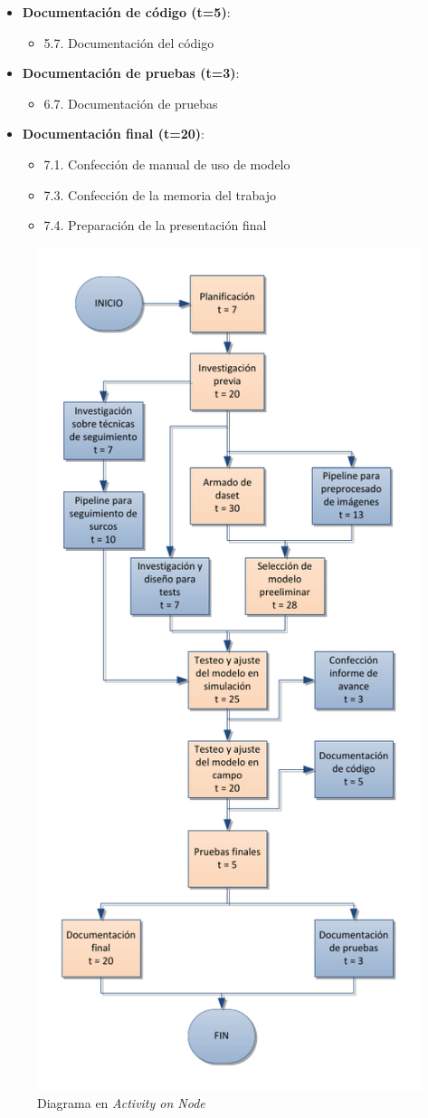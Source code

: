 \documentclass[
11pt, %
]{charter}
\begin{document}
\begin{itemize}
\item \textbf{Documentación de código (t=5)}:
\begin{itemize}
\item 5.7. Documentación del código
\end{itemize}

\item \textbf{Documentación de pruebas (t=3)}:
\begin{itemize}
\item 6.7. Documentación de pruebas
\end{itemize}

\item \textbf{Documentación final (t=20)}:
\begin{itemize}
\item 7.1. Confección de manual de uso de modelo
\item 7.3. Confección de la memoria del trabajo
\item 7.4. Preparación de la presentación final
\end{itemize}

\end{itemize}

\begin{figure}[htpb]
\centering 
\includegraphics[width=.65\textwidth]{./Figuras/aon.pdf}
\caption{Diagrama en \textit{Activity on Node}}
\label{fig:aon}
\end{figure}
\end{document}
